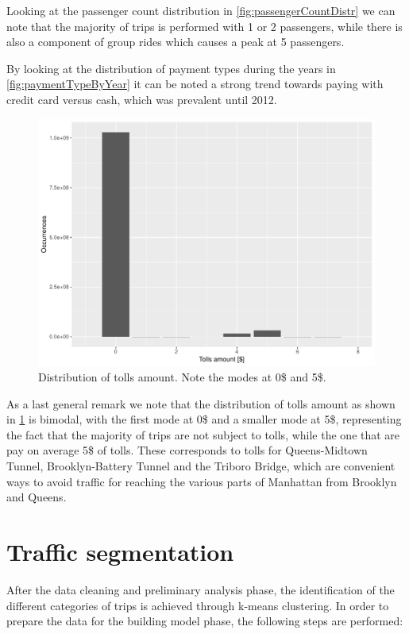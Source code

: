 \documentclass{acm_proc_article-sp-sigmod09}
\begin{document}
Looking at the passenger count distribution in \cref{fig:passengerCountDistr} we can note that the majority of trips is performed with 1 or 2 passengers, while there is also a component of group rides which causes a peak at 5 passengers.

By looking at the distribution of payment types during the years in \cref{fig:paymentTypeByYear} it can be noted a strong trend towards paying with credit card versus cash, which was prevalent until 2012.

\begin{figure}
	\centering
	\includegraphics[width=1\columnwidth]{resources/base_plots/tolls_amount_distr.pdf}
	\caption{Distribution of tolls amount. Note the modes at 0\$ and 5\$.}
	\label{fig:tollsAmountDistr}
\end{figure}

As a last general remark we note that the distribution of tolls amount as shown in \cref{fig:tollsAmountDistr} is bimodal, with the first mode at 0\$ and a smaller mode at 5\$, representing the fact that the majority of trips are not subject to tolls, while the one that are pay on average 5\$ of tolls. These corresponds to tolls for Queens-Midtown Tunnel, Brooklyn-Battery Tunnel and the Triboro Bridge, which are convenient ways to avoid traffic for reaching the various parts of Manhattan from Brooklyn and Queens.

\section{Traffic segmentation}

After the data cleaning and preliminary analysis phase, the identification of the different categories of trips is achieved through k-means clustering. In order to prepare the data for the building model phase, the following steps are performed:
\end{document}
